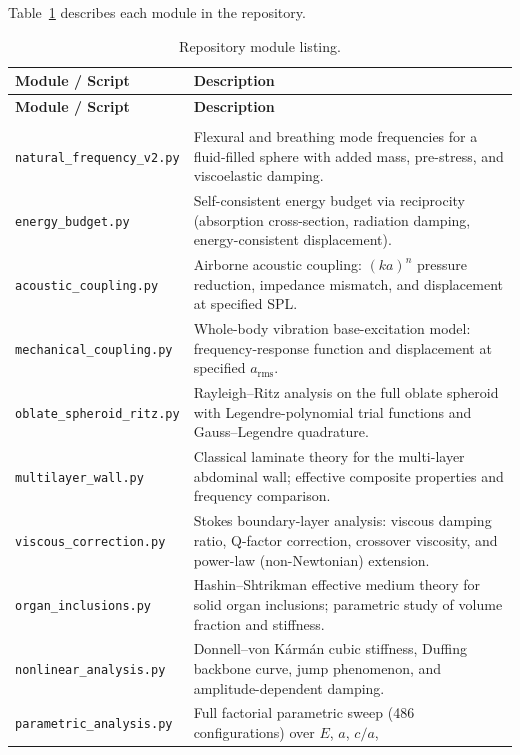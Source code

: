 \documentclass[12pt]{article}
\begin{document}
Table~\ref{tab:modules} describes each module in the repository.

\begin{longtable}{@{}p{5.5cm}p{9.5cm}@{}}
\caption{Repository module listing.}\label{tab:modules} \\
\toprule
\textbf{Module / Script} & \textbf{Description} \\
\midrule
\endfirsthead
\toprule
\textbf{Module / Script} & \textbf{Description} \\
\midrule
\endhead
\bottomrule
\endlastfoot
\multicolumn{2}{@{}l}{\textit{Analytical models} (\texttt{src/analytical/})} \\
\midrule
\texttt{natural\_frequency\_v2.py} &
  Flexural and breathing mode frequencies for a fluid-filled sphere with
  added mass, pre-stress, and viscoelastic damping. \\
\texttt{energy\_budget.py} &
  Self-consistent energy budget via reciprocity (absorption cross-section,
  radiation damping, energy-consistent displacement). \\
\texttt{acoustic\_coupling.py} &
  Airborne acoustic coupling: $(ka)^{n}$ pressure reduction, impedance
  mismatch, and displacement at specified SPL. \\
\texttt{mechanical\_coupling.py} &
  Whole-body vibration base-excitation model: frequency-response function
  and displacement at specified $a_{\mathrm{rms}}$. \\
\texttt{oblate\_spheroid\_ritz.py} &
  Rayleigh--Ritz analysis on the full oblate spheroid with Legendre-polynomial
  trial functions and Gauss--Legendre quadrature. \\
\texttt{multilayer\_wall.py} &
  Classical laminate theory for the multi-layer abdominal wall; effective
  composite properties and frequency comparison. \\
\texttt{viscous\_correction.py} &
  Stokes boundary-layer analysis: viscous damping ratio, Q-factor correction,
  crossover viscosity, and power-law (non-Newtonian) extension. \\
\texttt{organ\_inclusions.py} &
  Hashin--Shtrikman effective medium theory for solid organ inclusions;
  parametric study of volume fraction and stiffness. \\
\texttt{nonlinear\_analysis.py} &
  Donnell--von K\'{a}rm\'{a}n cubic stiffness, Duffing backbone curve, jump
  phenomenon, and amplitude-dependent damping. \\
\texttt{parametric\_analysis.py} &
  Full factorial parametric sweep (486 configurations) over $E$, $a$, $c/a$,

\end{longtable}
\end{document}
